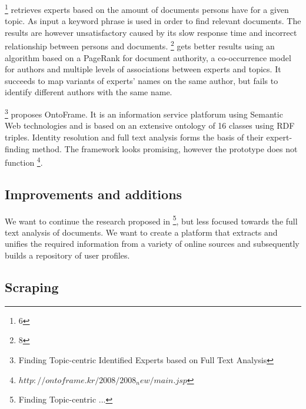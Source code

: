 \footnote{6} retrieves experts based on the amount of documents persons have for a given topic. As input a keyword phrase is used in order to find relevant documents. The results are however unsatisfactory caused by its slow response time and incorrect relationship between persons and documents. \footnote{8} gets better results using an algorithm based on a PageRank for document authority, a co-occurrence model for authors and multiple levels of associations between experts and topics. It succeeds to map variants of experts' names on the same author, but fails to identify different authors with the same name.

\footnote{Finding Topic-centric Identified Experts based on Full Text Analysis} proposes OntoFrame. It is an information service platforum using Semantic Web technologies and is based on an extensive ontology of 16 classes using RDF triples. Identity resolution and full text analysis forms the basis of their expert-finding method. The framework looks promising, however the prototype does not function \footnote{$http://ontoframe.kr/2008/2008_new/main.jsp$}.

\subsection{Improvements and additions}


We want to continue the research proposed in \footnote{Finding Topic-centric ...}, but less focused towards the full text analysis of documents. We want to create a platform that extracts and unifies the required information from a variety of online sources and subsequently builds a repository of user profiles.





\subsection{Scraping}

